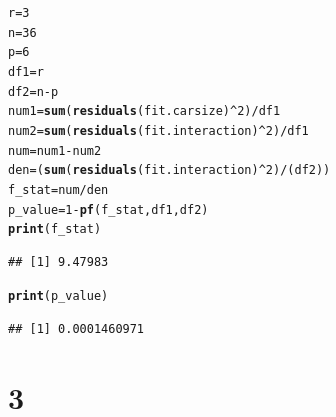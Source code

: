 \documentclass{article}\usepackage[]{graphicx}\usepackage[]{color}
\makeatletter
\newcommand{\hlnum}[1]{\textcolor[rgb]{0.686,0.059,0.569}{#1}}%
\newcommand{\hlopt}[1]{\textcolor[rgb]{0,0,0}{#1}}%
\newcommand{\hlstd}[1]{\textcolor[rgb]{0.345,0.345,0.345}{#1}}%
\newcommand{\hlkwb}[1]{\textcolor[rgb]{0.69,0.353,0.396}{#1}}%
\newcommand{\hlkwd}[1]{\textcolor[rgb]{0.737,0.353,0.396}{\textbf{#1}}}%
\newenvironment{kframe}{%
 \def\at@end@of@kframe{}%
 \ifinner\ifhmode%
  \def\at@end@of@kframe{\end{minipage}}%
  \begin{minipage}{\columnwidth}%
 \fi\fi%
 \def\FrameCommand##1{\hskip\@totalleftmargin \hskip-\fboxsep
 \colorbox{shadecolor}{##1}\hskip-\fboxsep
     \hskip-\linewidth \hskip-\@totalleftmargin \hskip\columnwidth}%
 \MakeFramed {\advance\hsize-\width
   \@totalleftmargin\z@ \linewidth\hsize
   \@setminipage}}%
 {\par\unskip\endMakeFramed%
 \at@end@of@kframe}
\newenvironment{knitrout}{}{} %
\makeatother
\begin{document}
\begin{knitrout}
\color{fgcolor}\begin{kframe}
\begin{alltt}
\hlstd{r} \hlkwb{=} \hlnum{3}
\hlstd{n} \hlkwb{=} \hlnum{36}
\hlstd{p} \hlkwb{=} \hlnum{6}
\hlstd{df1} \hlkwb{=}\hlstd{r}
\hlstd{df2} \hlkwb{=} \hlstd{n}\hlopt{-}\hlstd{p}
\hlstd{num1} \hlkwb{=} \hlkwd{sum}\hlstd{(}\hlkwd{residuals}\hlstd{(fit.carsize)}\hlopt{^}\hlnum{2}\hlstd{)}\hlopt{/} \hlstd{df1}
\hlstd{num2} \hlkwb{=} \hlkwd{sum}\hlstd{(}\hlkwd{residuals}\hlstd{(fit.interaction)}\hlopt{^}\hlnum{2}\hlstd{)} \hlopt{/} \hlstd{df1}
\hlstd{num} \hlkwb{=} \hlstd{num1} \hlopt{-} \hlstd{num2}
\hlstd{den}\hlkwb{=}  \hlstd{(}\hlkwd{sum}\hlstd{(}\hlkwd{residuals}\hlstd{(fit.interaction)}\hlopt{^}\hlnum{2}\hlstd{)}\hlopt{/}\hlstd{(df2))}
\hlstd{f_stat} \hlkwb{=} \hlstd{num}\hlopt{/}\hlstd{den}
\hlstd{p_value} \hlkwb{=} \hlnum{1} \hlopt{-} \hlkwd{pf}\hlstd{(f_stat,df1,df2)}
\hlkwd{print}\hlstd{(f_stat)}
\end{alltt}
\begin{verbatim}
## [1] 9.47983
\end{verbatim}
\begin{alltt}
\hlkwd{print}\hlstd{(p_value)}
\end{alltt}
\begin{verbatim}
## [1] 0.0001460971
\end{verbatim}
\end{kframe}
\end{knitrout}

\clearpage

\section*{3}
\end{document}
